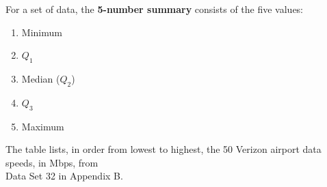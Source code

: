 \documentclass{beamer}
\begin{document}
\begin{frame}
\begin{definition}
For a set of data, the \textbf{5-number summary} consists of the five values:
\begin{enumerate}
\item Minimum
\item $Q_1$
\item Median ($Q_2$)
\item $Q_3$
\item Maximum
\end{enumerate}
\end{definition}
\end{frame}

\begin{frame}
\begin{example}
The table lists, in order from lowest to highest, the 50 Verizon airport data speeds, in Mbps, from\\ Data Set 32 in Appendix B.


\end{example}
\end{frame}
\end{document}
